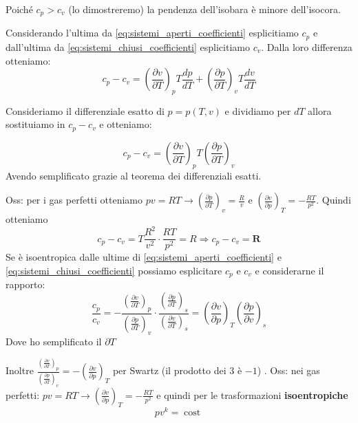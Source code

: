 \documentclass[a4paper]{article}
\numberwithin{equation}{section}%
\begin{document}
Poiché $c_p>c_v$ (lo dimostreremo) la pendenza dell'isobara è minore dell'isocora.
\newline

Considerando  l'ultima da \eqref{eq:sistemi_aperti_coefficienti} esplicitiamo $c_p$ e dall'ultima da \eqref{eq:sistemi_chiusi_coefficienti} esplicitiamo $c_v$. Dalla loro differenza otteniamo: 
\begin{equation}
	c_{p}-c_{v}=\left(\frac{\partial v}{\partial T}\right)_{p} T \frac{d p}{d T}+\left(\frac{\partial p}{\partial T}\right)_{v} T \frac{d v}{d T}
\end{equation}

Consideriamo il differenziale esatto di $p=p(T,v)$ e dividiamo per $dT$ allora sostituiamo in $c_p-c_v$ e otteniamo:

\begin{equation}
	c_{p}-c_{v}=\left(\frac{\partial v}{\partial T}\right)_{p} T\left(\frac{\partial p}{\partial T}\right)_{v}
		\label{eq:cp-cv}
\end{equation}
Avendo semplificato grazie al teorema dei differenziali esatti.
\newline

Oss: per i gas perfetti otteniamo $p v=R T \rightarrow\left(\frac{\partial p}{\partial T}\right)_{v}=\frac{R}{v}$ e $\left(\frac{\partial v}{\partial p}\right)_{T}=-\frac{R T}{p^{2}}$.
Quindi otteniamo \begin{equation}
	c_{p}-c_{v}=T \frac{R^{2}}{v^{2}} \cdot \frac{R T}{p^{2}}=R \Rightarrow {c}_{{p}}-{c}_{v}=\boldsymbol{R}
		\label{eq:cp-cv-R}
\end{equation}
\newline
Se è isoentropica dalle ultime di  \eqref{eq:sistemi_aperti_coefficienti} e  \eqref{eq:sistemi_chiusi_coefficienti} possiamo esplicitare $c_p$ e $c_v$ e considerarne il rapporto: \begin{equation}
\frac{c_{p}}{c_{v}}=-\frac{\left(\frac{\partial v}{\partial T}\right)_{p}}{\left(\frac{\partial p}{\partial T}\right)_{v}} \cdot \frac{\left(\frac{\partial p}{\partial T}\right)_{s}}{\left(\frac{\partial v}{\partial T}\right)_{s}}=\left(\frac{\partial v}{\partial p}\right)_{T}\left(\frac{\partial p}{\partial v}\right)_{s}
	\label{eq:cp/cv}
\end{equation}
Dove ho semplificato il $\partial T$

Inoltre $\frac{\left(\frac{\partial v}{\partial T}\right)_{p}}{\left(\frac{\partial p}{\partial T}\right)_{v}}=-\left(\frac{\partial v}{\partial p}\right)_{T}$ per Swartz (il prodotto dei 3 è $-1$) . 
\newline
Oss: nei gas perfetti: 
$p v=R T \rightarrow\left(\frac{\partial v}{\partial p}\right)_{T}=-\frac{R T}{p^{2}}$
e quindi per le trasformazioni \textbf{isoentropiche} \begin{equation}
	pv^k=\operatorname{cost}
\end{equation}
\end{document}
